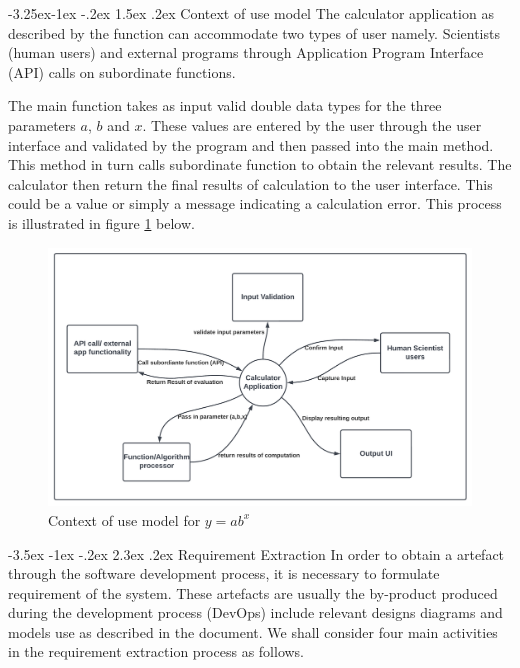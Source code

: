 \documentclass[11pt]{article}
\makeatletter
\renewcommand\section{\@startsection {section}{1}{\z@}%
                                       {-3.5ex \@plus -1ex \@minus -.2ex}%
                                       {2.3ex \@plus.2ex}%
                                       {\normalfont\fontfamily{phv}\fontsize{16}{19}\bfseries}}
\renewcommand\subsection{\@startsection{subsection}{2}{\z@}%
                                         {-3.25ex\@plus -1ex \@minus -.2ex}%
                                         {1.5ex \@plus .2ex}%
                                         {\normalfont\fontfamily{phv}\fontsize{14}{17}\bfseries}}
\makeatother
\begin{document}
\subsection{Context of use model}
The calculator application as described by the function can accommodate two types of user namely. Scientists (human users) and external programs through Application Program Interface (API) calls on subordinate functions.\par
The main function takes as input valid double data types for the three parameters $a$, $b$ and $x$. These values are entered by the user through the user interface and validated by the program and then passed into the main method. This method in turn calls subordinate function to obtain the relevant results. The calculator then return the final results of calculation to the user interface. This could be a value or simply a message indicating a calculation error. This process is illustrated in figure \ref{fig3} below.
\begin{figure}[H]
	\centering
	\includegraphics[width=\linewidth]{Figures/ContextDiagram}
	\caption{Context of use model for $y=ab^x$}
	\label{fig3}
\end{figure}

\section{Requirement Extraction} \label{s:sec2}
In order to obtain a artefact through the software development process, it is necessary to formulate requirement of the system. These artefacts are usually the by-product produced during the development process (DevOps) include relevant designs diagrams and models use as described in the document. We shall consider four main activities in the requirement extraction process as follows.
\end{document}
